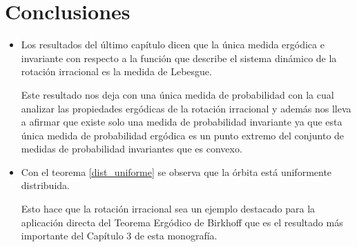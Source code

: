 \chapter*{Conclusiones}

\begin{itemize}
	\item Los resultados del último capítulo dicen que la única medida ergódica e invariante con respecto a la función que describe el sistema dinámico de la rotación irracional es la medida de Lebesgue.
	
	Este resultado nos deja con una única medida de probabilidad con la cual analizar las propiedades ergódicas de la rotación irracional y además nos lleva a afirmar que existe solo una medida de probabilidad invariante ya que esta única medida de probabilidad ergódica es un punto extremo del conjunto de medidas de probabilidad invariantes que es convexo.
	
	\item Con el teorema \ref{dist_uniforme} se observa que la órbita está uniformente distribuida.
	
	Esto hace que la rotación irracional sea un ejemplo destacado para la aplicación directa del Teorema Ergódico de Birkhoff que es el resultado más importante del Capítulo 3 de esta monografía.
\end{itemize}


